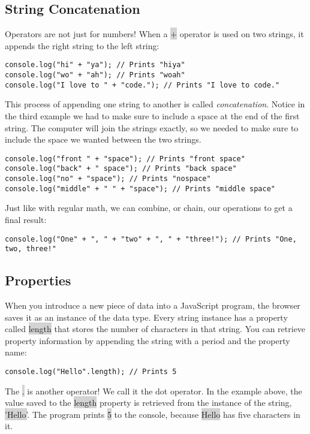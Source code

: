 \documentclass[11pt]{article}
\begin{document}
\subsection{String Concatenation}
Operators are not just for numbers! When a \colorbox{lightgray}{$+$} operator is used on two strings, it appends the right string to the left string:
\begin{lstlisting}
console.log("hi" + "ya"); // Prints "hiya"
console.log("wo" + "ah"); // Prints "woah"
console.log("I love to " + "code."); // Prints "I love to code."
\end{lstlisting}
This process of appending one string to another is called \textit{concatenation}. Notice in the third example we had to make sure to include a space at the end of the first string. The computer will join the strings exactly, so we needed to make sure to include the space we wanted between the two strings.
\begin{lstlisting}
console.log("front " + "space"); // Prints "front space"
console.log("back" + " space"); // Prints "back space"
console.log("no" + "space"); // Prints "nospace"
console.log("middle" + " " + "space"); // Prints "middle space"
\end{lstlisting}
Just like with regular math, we can combine, or chain, our operations to get a final result:
\begin{lstlisting}
console.log("One" + ", " + "two" + ", " + "three!"); // Prints "One, two, three!"
\end{lstlisting}
\subsection{Properties}
When you introduce a new piece of data into a JavaScript program, the browser saves it as an instance of the data type. Every string instance has a property called \colorbox{lightgray}{length} that stores the number of characters in that string. You can retrieve property information by appending the string with a period and the property name:
\begin{lstlisting}
console.log("Hello".length); // Prints 5
\end{lstlisting}
The \colorbox{lightgray}{$.$} is another operator! We call it the dot operator. In the example above, the value saved to the \colorbox{lightgray}{length} property is retrieved from the instance of the string, \colorbox{lightgray}{'Hello'}. The program prints \colorbox{lightgray}{5} to the console, because \colorbox{lightgray}{Hello} has five characters in it.
\end{document}
